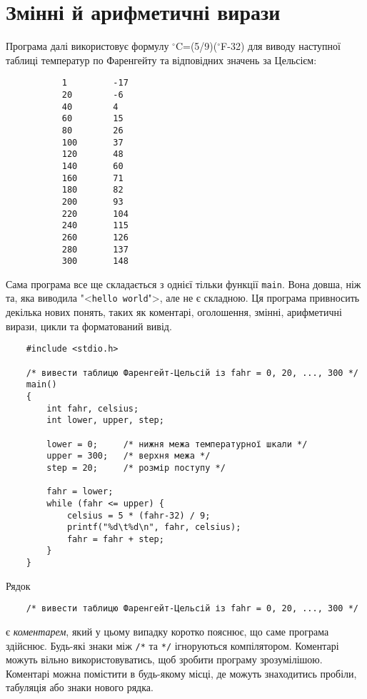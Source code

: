 \documentclass[a4paper,12pt]{book}
\begin{document}
\section{Змінні й арифметичні вирази}

\label{f0:ch1.2}
  Програма далі використовує формулу \mbox{${}^\circ$}C=(5/9)(\mbox{${}^\circ$}F-32) для виводу наступної
  таблиці температур по Фаренгейту та відповідних значень за Цельсієм:
  \begin{verbatim}
           1         -17
           20        -6
           40        4
           60        15
           80        26
           100       37
           120       48
           140       60
           160       71
           180       82
           200       93
           220       104
           240       115
           260       126
           280       137
           300       148
  \end{verbatim}

  Сама програма все ще складається з однієї тільки функції \texttt{main}. Вона довша, ніж
  та, яка виводила "<\texttt{hello world}">, але не є складною. Ця програма
  привносить декілька нових понять, таких як коментарі, оголошення, змінні, арифметичні
  вирази, цикли та форматований вивід.

  \begin{verbatim}
    #include <stdio.h>

    /* вивести таблицю Фаренгейт-Цельсій із fahr = 0, 20, ..., 300 */
    main()
    {
        int fahr, celsius;
        int lower, upper, step;

        lower = 0;     /* нижня межа температурної шкали */
        upper = 300;   /* верхня межа */
        step = 20;     /* розмір поступу */

        fahr = lower;
        while (fahr <= upper) {
            celsius = 5 * (fahr-32) / 9;
            printf("%d\t%d\n", fahr, celsius);
            fahr = fahr + step;
        }
    }
  \end{verbatim}

  Рядок
  \begin{verbatim}
    /* вивести таблицю Фаренгейт-Цельсій із fahr = 0, 20, ..., 300 */
  \end{verbatim}
  є \textit{коментарем}, який у цьому випадку коротко пояснює, що саме програма здійснює.
  Будь-які знаки між \texttt{/*} та \texttt{*/} ігноруються компілятором. Коментарі можуть
  вільно використовуватись, щоб зробити програму зрозумілішою. Коментарі можна помістити в
  будь-якому місці, де можуть знаходитись пробіли, табуляція або знаки нового рядка.
\end{document}
